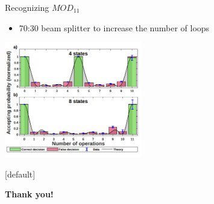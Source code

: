 \documentclass[aspectratio=169,9pt]{beamer}
\begin{document}
\begin{frame}[t]{Recognizing $MOD_{11}$}
  \begin{itemize}
    \item 70:30 beam splitter to increase the number of loops
  \end{itemize}
  \begin{center}
    \includegraphics[width=0.45\textwidth]{4states_8states.png}
  \end{center}
\end{frame}




{ %
\makeatletter %
    [default] %
    \def\beamer@entrycode{\vspace*{-\headheight}} %
\makeatother
\begin{frame}
  \begin{center}
    \textbf{\Large Thank you!}
  \end{center}
\end{frame}
}





\end{document}
